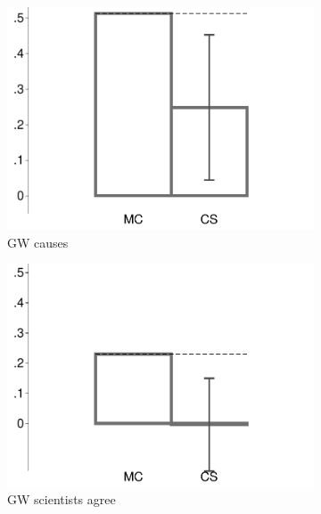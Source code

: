 \begin{figure}[t]
\begin{subfigure}{.325\textwidth}
		\includegraphics[width=\textwidth]{../figs/confidence_score_ccd_imc_14k_increase_study1.pdf}
		\caption{GW causes}
	\end{subfigure}	
	\hfill
	\begin{subfigure}{.325\textwidth}\centering
		\includegraphics[width=\textwidth]{../figs/confidence_score_ccd_imc_14k_science_study1.pdf}
		\caption{GW scientists agree}
	\end{subfigure}	
	\begin{subfigure}{.325\textwidth}\centering

\end{subfigure}
\end{figure}
